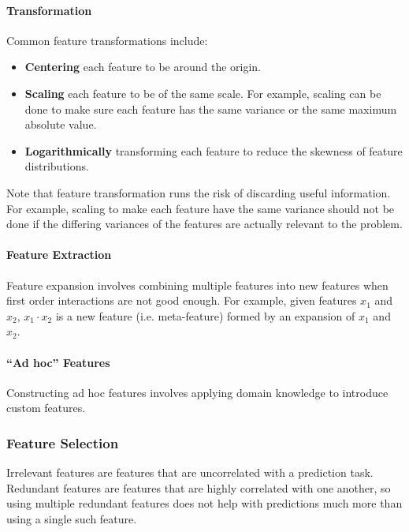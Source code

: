 \documentclass[12pt]{article}
\begin{document}
            \paragraph{Transformation}
            Common feature transformations include:
            \begin{itemize}
                \item \textbf{Centering} each feature to be around the origin.
                \item \textbf{Scaling} each feature to be of the same scale. For example, scaling can be done to make sure each feature has the same
                variance or the same maximum absolute value.
                \item \textbf{Logarithmically} transforming each feature to reduce the skewness of feature distributions.
            \end{itemize}

            Note that feature transformation runs the risk of discarding useful information. For example, scaling to make each feature have the same
            variance should not be done if the differing variances of the features are actually relevant to the problem.

            \paragraph{Feature Extraction}
            Feature expansion involves combining multiple features into new features when first order interactions are not good enough. For example, given
            features $x_1$ and $x_2$, $x_1 \cdot x_2$ is a new feature (i.e. meta-feature) formed by an expansion of $x_1$ and $x_2$.

            \paragraph{``Ad hoc'' Features}
            Constructing ad hoc features involves applying domain knowledge to introduce custom features.

        \subsubsection{Feature Selection}
            Irrelevant features are features that are uncorrelated with a prediction task. Redundant features are features that are highly correlated with
            one another, so using multiple redundant features does not help with predictions much more than using a single such feature.
\end{document}
